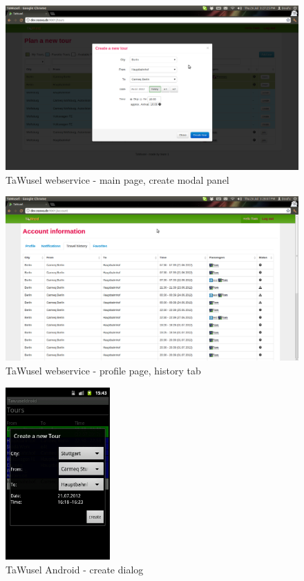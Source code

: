 \begin{figure}[h]
	\includegraphics[width=16cm]{images/TaWusel_Web_create.png}
	\caption{TaWusel webservice - main page, create modal panel}
	\label{img:WebCreate}
\end{figure}

\begin{figure}[h]
	\includegraphics[width=16cm]{images/TaWusel_Web_history.png}
	\caption{TaWusel webservice - profile page, history tab}
	\label{img:WebHistory}
\end{figure}

\begin{figure}[h]
	\centering
	\includegraphics[width=4cm]{images/Tawuseldroid_create}
	\caption{TaWusel Android - create dialog}
	\label{img:AndCD}
\end{figure}


